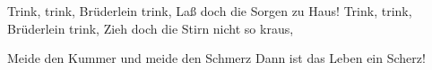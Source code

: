 \begin{verse*}
Trink, trink, Brüderlein trink,
Laß doch die Sorgen zu Haus!
Trink, trink, Brüderlein trink,
Zieh doch die Stirn nicht so kraus,
\end{verse*}

\begin{verse*}
 Meide den Kummer und meide den Schmerz
Dann ist das Leben ein Scherz!
\end{verse*}
